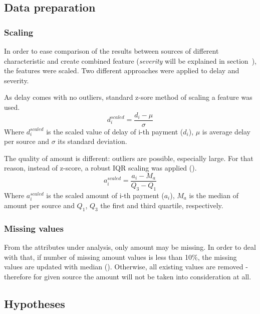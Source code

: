\documentclass{article}
\begin{document}
\subsection{Data preparation}

\subsubsection{Scaling}
In order to ease comparison of the results between sources of different characteristic and
create combined feature (\textit{severity} will be explained in section\ ), the features were scaled.
Two different approaches were applied to delay and severity.\par
As delay comes with no outliers, standard z-sore method of scaling a feature was used.
\[d_i^{scaled}=\frac{d_i-\mu}{\sigma}\]
Where \(d_i^{scaled}\) is the scaled value of delay of i-th payment (\(d_i\)), $\mu$ is average delay per source and $\sigma$ its standard deviation.
\par
The quality of amount is different: outliers are possible, especially large.
For that reason, instead of z-score, a robust IQR scaling was applied (\cite{scikitlearn}).
\[a_i^{scaled}=\frac{a_i-M_a}{Q_3-Q_1}\]
Where \(a_i^{scaled}\) is the scaled amount of i-th payment (\(a_i\)), \(M_a\) is the median of amount per source and \(Q_1\), \(Q_3\) the first and third quartile, respectively.

\subsubsection{Missing values}
From the attributes under analysis, only amount may be missing.
In order to deal with that, if number of missing amount values is less than 10\%, the missing values are updated with median (\cite{szeliga}).
Otherwise, all existing values are removed - therefore for given source the amount will not be taken into consideration at all.

\subsection{Hypotheses}
\label{section:hypotheses}
\end{document}
